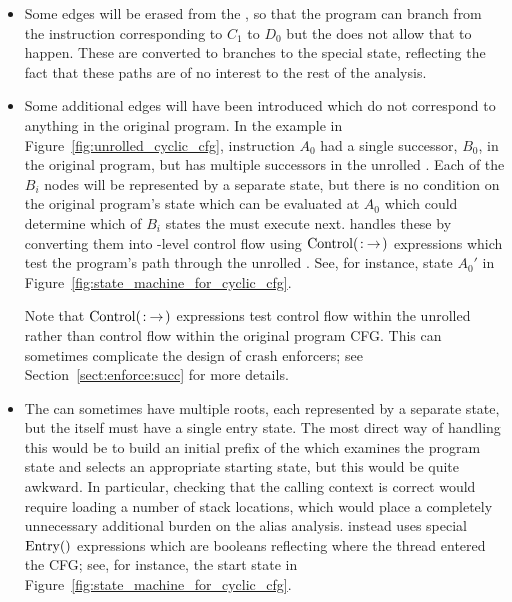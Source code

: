 \begin{itemize}
\item
  Some edges will be erased from the , so that the
  program can branch from the instruction corresponding to $C_1$ to
  $D_0$ but the  does not allow that to happen.  These
  are converted to branches to the special {\stUnreached} state,
  reflecting the fact that these paths are of no interest to the rest
  of the analysis.

\item
  Some additional edges will have been introduced which do not
  correspond to anything in the original program.  In the example in
  Figure~\ref{fig:unrolled_cyclic_cfg}, instruction $A_0$ had a single
  successor, $B_0$, in the original program, but has multiple
  successors in the unrolled .  Each of the $B_i$
   nodes will be represented by a separate
  {\StateMachine} state, but there is no condition on the
  original program's state which can be evaluated at $A_0$
  which could determine which of $B_i$ states the
  {\StateMachine} must execute next.  {\Technique} handles
  these by converting them into \StateMachine-level control
  flow using $\mathrm{Control}(\mathrm{}\!:\!\mathrm{}\!\rightarrow\!\mathrm{})$ expressions which test the
  program's path through the unrolled .  See, for
  instance, state $A_0'$ in
  Figure~\ref{fig:state_machine_for_cyclic_cfg}.

  Note that $\mathrm{Control}(\mathrm{}\!:\!\mathrm{}\!\rightarrow\!\mathrm{})$ expressions test control flow within
  the unrolled  rather than control flow within the
  original program CFG.  This can sometimes complicate the design of
  crash enforcers; see Section~\ref{sect:enforce:succ} for more
  details.

\item
  The  can sometimes have multiple roots, each
  represented by a separate {\StateMachine} state, but the
  {\StateMachine} itself must have a single entry state.  The most
  direct way of handling this would be to build an initial prefix of
  the {\StateMachine} which examines the program state and selects an
  appropriate starting state, but this would be quite awkward.  In
  particular, checking that the calling context is correct would
  require loading a number of stack locations, which would place a
  completely unnecessary additional burden on the alias analysis.
  {\Technique} instead uses special $\mathrm{Entry}()$ expressions which
  are booleans reflecting where the thread entered the CFG; see, for
  instance, the start state in
  Figure~\ref{fig:state_machine_for_cyclic_cfg}.

\end{itemize}

